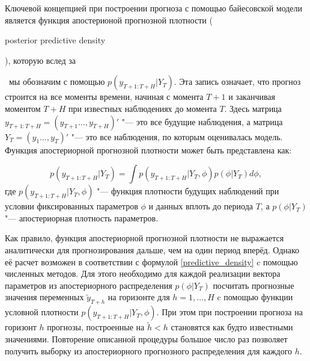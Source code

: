 \documentclass[11pt]{article} %
\newcommand{\eng}[1]{\begin{otherlanguage}{english}#1\end{otherlanguage}}
\begin{document}
Ключевой концепцией при построении прогноза с помощью байесовской модели является функция апостерионой прогнозной плотности (\eng{posterior predictive density}), которую вслед за \eng{\cite{karlsson_2012}}~мы обозначим с помощью $p(y_{T+1:T+H}|Y_{T})$. Эта запись означает, что прогноз строится на все моменты времени, начиная с момента $T+1$ и заканчивая моментом $T+H$ при известных наблюдениях до момента $T$. Здесь матрица $y_{T+1:T+H}=(y_{T+1}\ldots, y_{T+H} )'$ "--- это все будущие наблюдения, а матрица $Y_T=(y_{1}\ldots, y_{T} )'$ "--- это все наблюдения, по которым оценивалась модель. Функция апостериорной прогнозной плотности может быть представлена как:

\begin{equation}\label{predictive_density}
p(y_{T+1:T+H}|Y_{T})=\int p(y_{T+1:T+H}|Y_{T},\phi) p(\phi |Y_T) d\phi,
\end{equation}
где $p(y_{T+1:T+H}|Y_{T},\phi)$ "--- функция плотности будущих наблюдений при условии фиксированных параметров $\phi$ и данных вплоть до периода $T$, а $p(\phi |Y_T)$ "--- апостериорная плотность параметров.

Как правило, функция апостериорной прогнозной плотности не выражается аналитически для прогнозирования дальше, чем на один период вперёд. Однако её расчет возможен в соответствии с формулой \eqref{predictive_density} c помощью численных методов. Для этого необходимо для каждой реализации вектора параметров из апостериорного распределения $p(\phi |Y_T)$ посчитать прогнозные значения переменных $\tilde y_{T+h}$ на горизонте для $h=1,\ldots, H$ c помощью функции условной плотности $p(y_{T+1:T+H}|Y_{T},\phi)$. При этом при построении прогноза на горизонт $h$ прогнозы, построенные на $\tilde h<h$ становятся как будто известными значениями. Повторение описанной процедуры большое число раз позволяет получить выборку из апостериорного прогнозного распределения для каждого $h$.

\end{document}
